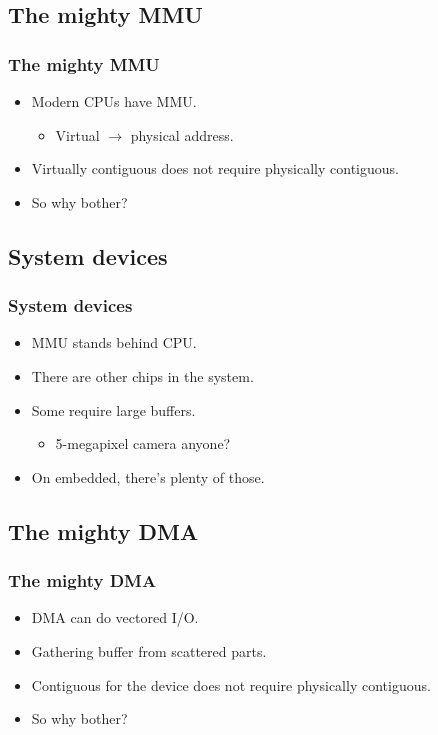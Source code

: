 
\subsection{The mighty MMU}
\begin{frame}
  \frametitle{The mighty MMU}

  \begin{itemize}
  \item Modern CPUs have MMU.
    \begin{itemize}
    \item Virtual $\rightarrow$ physical address.
    \end{itemize}
  \item Virtually contiguous does not require physically contiguous.
  \item So why bother?
  \end{itemize}
\end{frame}

\subsection{System devices}
\begin{frame}
  \frametitle{System devices}

  \begin{itemize}
  \item MMU stands behind CPU.
  \item There are other chips in the system.
  \item Some require large buffers.
    \begin{itemize}
    \item 5-megapixel camera anyone?
    \end{itemize}
  \item On embedded, there's plenty of those.
  \end{itemize}
\end{frame}

\subsection{The mighty DMA}
\begin{frame}
  \frametitle{The mighty DMA}

  \begin{itemize}
  \item DMA can do vectored I/O.
  \item Gathering buffer from scattered parts.
  \item Contiguous for the device does not require physically contiguous.
  \item So why bother?
  \end{itemize}
\end{frame}


